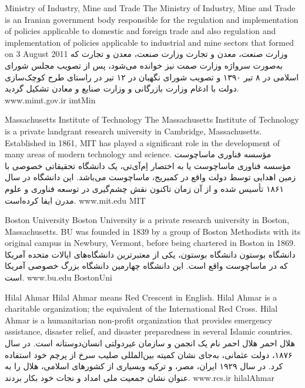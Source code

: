 
\instituteC
{Ministry of Industry, Mine and Trade}
{The Ministry of Industry, Mine and Trade is an Iranian government body responsible for the regulation and implementation of
policies applicable to domestic and foreign trade and also regulation and implementation of policies applicable to industrial
and mine sectors that formed on 3 August 2011}
{}
{وزارت صنعت، معدن و تجارت}
{وزارت صنعت، معدن و تجارت که به‌صورت سرواژه وزارت صمت نیز خوانده می‌شود،
پس از تصویب مجلس شورای اسلامی در ۸ تیر ۱۳۹۰ و تصویب شورای نگهبان در ۱۲ تیر
در راستای طرح کوچک‌سازی دولت با ادغام وزارت بازرگانی و وزارت صنایع و معادن تشکیل گردید.}
{}
{www.mimt.gov.ir}
{imtMin}

\instituteC
{Massachusetts Institute of Technology}
{The Massachusetts Institute of Technology is a private landgrant research university in Cambridge, Massachusetts.
Established in 1861, MIT has played a significant role in the development of many areas of modern technology and science.}
{}
{مؤسسه فناوری ماساچوست}
{مؤسسه فناوری ماساچوست یا به اختصار اِم‌آی‌تی، یک دانشگاه تحقیقاتی خصوصی با زمین اهدایی توسط دولت واقع در کمبریج، ماساچوست می‌باشد.
این دانشگاه در سال ۱۸۶۱ تأسیس شده و از آن زمان تاکنون نقش چشم‌گیری در توسعه فناوری و علوم مدرن ایفا کرده‌است.}
{}
{www.mit.edu}
{MIT}

\instituteC
{Boston University}
{Boston University is a private research university in Boston, Massachusetts.
BU was founded in 1839 by a group of Boston Methodists with its original campus
in Newbury, Vermont, before being chartered in Boston in 1869.}
{}
{دانشگاه بوستون}
{دانشگاه بوستون، یکی از معتبرترین دانشگاه‌های ایالات متحده آمریکا که در ماساچوست واقع است.
این دانشگاه چهارمین دانشگاه بزرگ خصوصی آمریکا است.}
{}
{www.bu.edu}
{BostonUni}

\instituteC
{Hilal Ahmar}
{Hilal Ahmar means Red Crescent in English. Hilal Ahmar is a charitable organization; the equivalent of the International Red Cross.
Hilal Ahmar is a humanitarian non-profit organization that provides emergency assistance, disaster relief, and disaster preparedness
in several Islamic countries.}
{}
{هلال احمر}
{هلال احمر نام یک انجمن و سازمان غیردولتی انسان‌دوستانه است. در سال ۱۸۷۶، دولت عثمانی، به‌جای نشان کمیته بین‌المللی صلیب سرخ از پرچم خود استفاده کرد.
در سال ۱۹۲۹ ایران، مصر، و ترکیه وبسیاری از کشورهای اسلامی، هلال را به عنوان نشان جمعیت ملی امداد و نجات خود بکار بردند.}
{}
{www.rcs.ir}
{hilalAhmar}

